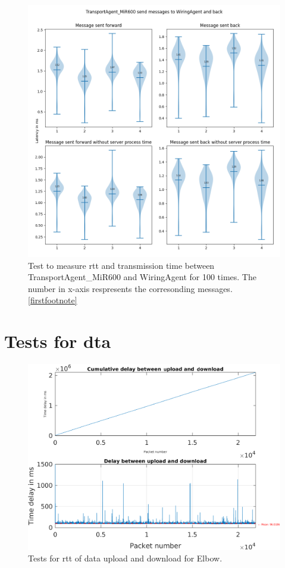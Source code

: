 \begin{figure}[p]
    \includegraphics[width=\textwidth]{figures/appendix/usecase/violin_TransportAgent_MiR600_to_WiringAgent.png}
    \centering
    \caption{Test to measure \gls{rtt} and transmission time between TransportAgent\_MiR600 and 
    WiringAgent for 100 times. The number in x-axis respresents the 
    corresonding messages. \protect\ref{firstfootnote}}
    \label{fig: violin-T600-WI}
\end{figure}





\newpage
\section{Tests for \gls{dta}}\label{chap: append-DTagent}
\begin{figure}[h]
    \centering
    \includegraphics[width=\textwidth]{figures/appendix/DT/Delay_UploadDownloadCycleTime_Elbow.pdf}\hfill 
    \caption{Tests for \gls{rtt} of data upload and download for Elbow.} \label{fig: UD-cycle-Elbow}
\end{figure}

